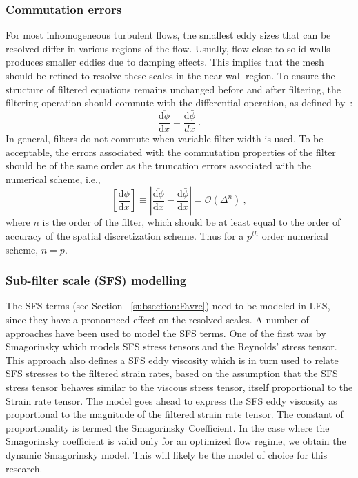 \subsubsection{Commutation errors} \label{section:commutation_errors}
For most inhomogeneous turbulent flows, the smallest eddy sizes that can be resolved differ in various regions of the flow. Usually, flow close to solid walls  produces smaller eddies due to damping effects. This implies that the mesh should be refined to resolve these scales in the near-wall region. To ensure the structure of filtered equations remains unchanged before and after filtering, the filtering operation should commute with the differential operation, as defined by~\cite{HPerez:2011}: 
\begin{equation} 
\overline{\frac{\mathrm{d} \phi}{\mathrm{d} x} } = \frac{\mathrm{d} \bar{\phi}}{dx} \: .
\end{equation}
In general, filters do not commute when variable filter width is used. To be acceptable, the errors associated with the commutation properties of the filter should be of the same order as the truncation errors associated with the numerical scheme, i.e.,
 \begin{equation} \label{eq:commutation_error}
\left[ \frac{\mathrm{d} \phi}{\mathrm{d} x}   \right]  \equiv \left| \overline{\frac{\mathrm{d} \phi}{\mathrm{d} x} } - \frac{\mathrm{d} \bar{\phi}}{\mathrm{d}x}\right| = \mathcal{O}(\Delta^n) \: ,
\end{equation}
 where $n$ is the order of the filter, which should be at least equal to the order of accuracy of the spatial discretization scheme. Thus for a $p^{th}$ order numerical scheme, $n = p$.


\subsubsection{Sub-filter scale (SFS) modelling}
The SFS terms (see Section ~\ref{subsection:Favre}) need to be modeled in LES, since they have a pronounced effect on the resolved scales. A number of approaches have been used to model the SFS terms. One of the first was by Smagorinsky \cite{Smagorinsky:1963} which models SFS stress tensors and the Reynolds' stress tensor. This approach also defines a SFS eddy viscosity which is in turn used to relate SFS stresses to the filtered strain rates, based on the assumption that the SFS stress tensor behaves similar to the viscous stress tensor, itself proportional to the Strain rate tensor. The model goes ahead to express the SFS eddy viscosity as proportional to the magnitude of the filtered strain rate tensor. The constant of proportionality is termed the Smagorinsky Coefficient. In the case where the Smagorinsky coefficient is valid only for an optimized flow regime, we obtain the dynamic Smagorinsky model. This will likely be the model of choice for this research.